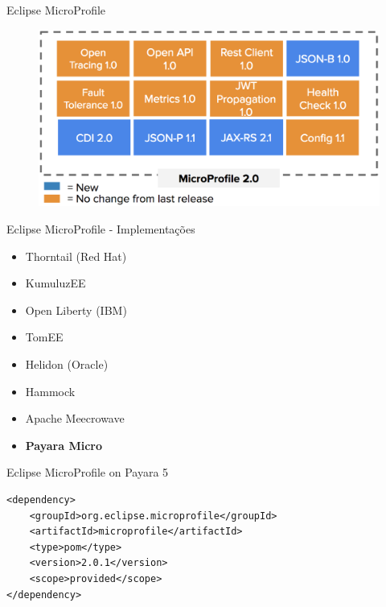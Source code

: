 \documentclass{beamer}
\begin{document}
\begin{frame}{Eclipse MicroProfile}
\begin{figure}
	\centering
	\includegraphics[width=\linewidth]{Images/mp5}
\end{figure}
\end{frame}


\begin{frame}{Eclipse MicroProfile - Implementações}
\begin{itemize}
	\item Thorntail (Red Hat)
	\item KumuluzEE
	\item Open Liberty (IBM)
	\item TomEE
	\item Helidon (Oracle)
	\item Hammock
	\item Apache Meecrowave
	\item \textbf{Payara Micro}
\end{itemize}
\end{frame}


\begin{frame}[fragile]{Eclipse MicroProfile on Payara 5}
\begin{lstlisting}
<dependency>
	<groupId>org.eclipse.microprofile</groupId>
	<artifactId>microprofile</artifactId>
	<type>pom</type>
	<version>2.0.1</version>
	<scope>provided</scope>
</dependency>
\end{lstlisting}
\end{frame}
\end{document}

